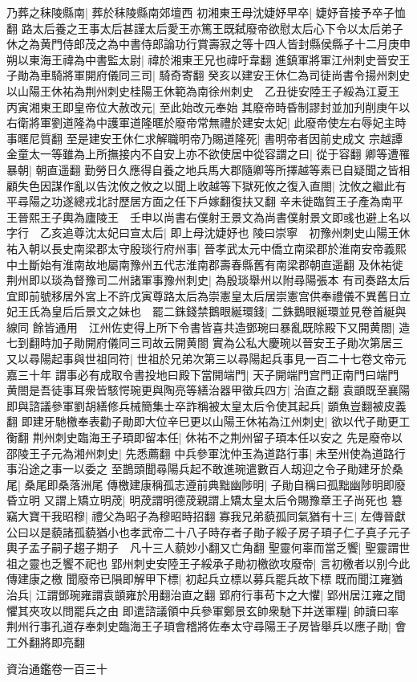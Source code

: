 乃葬之秣陵縣南|{
	葬於秣陵縣南郊壇西}
初湘東王母沈婕妤早卒|{
	婕妤音接予卒子恤翻}
路太后養之王事太后甚謹太后愛王亦篤王既弑廢帝欲慰太后心下令以太后弟子休之為黄門侍郎茂之為中書侍郎論功行賞壽寂之等十四人皆封縣侯縣子十二月庚申朔以東海王禕為中書監太尉|{
	禕於湘東王兄也禕吁韋翻}
進鎮軍將軍江州刺史晉安王子勛為車騎將軍開府儀同三司|{
	騎奇寄翻}
癸亥以建安王休仁為司徒尚書令揚州刺史以山陽王休祐為荆州刺史桂陽王休範為南徐州刺史　乙丑徙安陸王子綏為江夏王　丙寅湘東王即皇帝位大赦改元|{
	至此始改元奉始}
其廢帝時昏制謬封並加刋削庚午以右衛將軍劉道隆為中護軍道隆暱於廢帝常無禮於建安太妃|{
	此廢帝使左右辱妃主時事暱尼質翻}
至是建安王休仁求解職明帝乃賜道隆死|{
	書明帝者因前史成文}
宗越譚金童太一等雖為上所撫接内不自安上亦不欲使居中從容謂之曰|{
	從于容翻}
卿等遭罹暴朝|{
	朝直遥翻}
勤勞日久應得自養之地兵馬大郡隨卿等所擇越等素已自疑聞之皆相顧失色因謀作亂以告沈攸之攸之以聞上收越等下獄死攸之復入直閤|{
	沈攸之繼此有平尋陽之功遂總戎北討歷居方面之任下戶嫁翻復扶又翻}
辛未徙臨賀王子產為南平王晉熙王子輿為廬陵王　壬申以尚書右僕射王景文為尚書僕射景文即彧也避上名以字行　乙亥追尊沈太妃曰宣太后|{
	即上母沈婕妤也}
陵曰崇寧　初豫州刺史山陽王休祐入朝以長史南梁郡太守殷琰行府州事|{
	晉孝武太元中僑立南梁郡於淮南安帝義熙中土斷始有淮南故地屬南豫州五代志淮南郡壽春縣舊有南梁郡朝直遥翻}
及休祐徙荆州即以琰為督豫司二州諸軍事豫州刺史|{
	為殷琰舉州以附尋陽張本}
有司奏路太后宜即前號移居外宮上不許戊寅尊路太后為崇憲皇太后居崇憲宫供奉禮儀不異舊日立妃王氏為皇后后景文之妹也　罷二銖錢禁鵝眼綖環錢|{
	二銖鵝眼綖環並見卷首綖與線同}
餘皆通用　江州佐吏得上所下令書皆喜共造鄧琬曰暴亂既除殿下又開黄閤|{
	造七到翻時加子勛開府儀同三司故云開黄閤}
實為公私大慶琬以晉安王子勛次第居三又以尋陽起事與世祖同符|{
	世祖於兄弟次第三以尋陽起兵事見一百二十七卷文帝元嘉三十年}
謂事必有成取令書投地曰殿下當開端門|{
	天子開端門宫門正南門曰端門}
黄閤是吾徒事耳衆皆駭愕琬更與陶亮等繕治器甲徵兵四方|{
	治直之翻}
袁顗既至襄陽即與諮議參軍劉胡繕修兵械簡集士卒詐稱被太皇太后令使其起兵|{
	顗魚豈翻被皮義翻}
即建牙馳檄奉表勸子勛即大位辛巳更以山陽王休祐為江州刺史|{
	欲以代子勛更工衡翻}
荆州刺史臨海王子頊即留本任|{
	休祐不之荆州留子頊本任以安之}
先是廢帝以邵陵王子元為湘州刺史|{
	先悉薦翻}
中兵參軍沈仲玉為道路行事|{
	未至州使為道路行事沿途之事一以委之}
至鵲頭聞尋陽兵起不敢進琬遣數百人刼迎之令子勛建牙於桑尾|{
	桑尾即桑落洲尾}
傳檄建康稱孤志遵前典黜幽陟明|{
	子勛自稱曰孤黜幽陟明即廢昏立明}
又謂上矯立明荗|{
	明荗謂明德荗親謂上矯太皇太后令賜豫章王子尚死也}
簒竊大寶干我昭穆|{
	禮父為昭子為穆昭時招翻}
寡我兄弟藐孤同氣猶有十三|{
	左傳晉獻公曰以是藐諸孤藐猶小也孝武帝二十八子時存者子勛子綏子房子頊子仁子真子元子輿子孟子嗣子趨子期子　凡十三人藐妙小翻又亡角翻}
聖靈何辜而當乏饗|{
	聖靈謂世祖之靈也乏饗不祀也}
郢州刺史安陸王子綏承子勛初檄欲攻廢帝|{
	言初檄者以别今此傳建康之檄}
聞廢帝已隕即解甲下標|{
	初起兵立標以募兵罷兵故下標}
既而聞江雍猶治兵|{
	江謂鄧琬雍謂袁顗雍於用翻治直之翻}
郢府行事苟卞之大懼|{
	郢州居江雍之間懼其夾攻以問罷兵之由}
即遣諮議領中兵參軍鄭景玄帥衆馳下并送軍糧|{
	帥讀曰率}
荆州行事孔道存奉刺史臨海王子頊會稽將佐奉太守尋陽王子房皆舉兵以應子勛|{
	會工外翻將即亮翻}


資治通鑑卷一百三十
